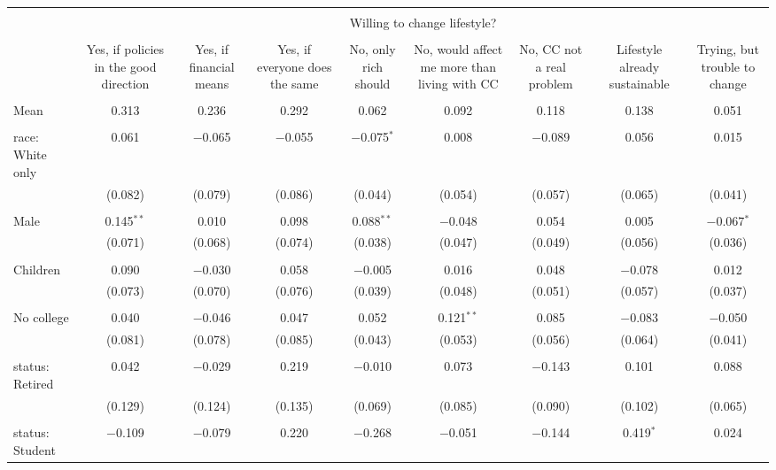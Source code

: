 
\begin{tabular}{@{\extracolsep{5pt}}lcccccccc} 
\\[-1.8ex]\hline 
\hline \\[-1.8ex] 
 & \multicolumn{8}{c}{Willing to change lifestyle?} \\ 
\cline{2-9} 
\\[-1.8ex] & Yes, if policies in the good direction & Yes, if financial means & Yes, if everyone does the same & No, only rich should & No, would affect me more than living with CC & No, CC not a real problem & Lifestyle already sustainable & Trying, but trouble to change \\ 
\hline \\[-1.8ex] 
 Mean & 0.313 & 0.236 & 0.292 & 0.062 & 0.092 & 0.118 & 0.138 & 0.051  \\ \hline \\[-1.8ex] race: White only & 0.061 & $-$0.065 & $-$0.055 & $-$0.075$^{*}$ & 0.008 & $-$0.089 & 0.056 & 0.015 \\ 
  & (0.082) & (0.079) & (0.086) & (0.044) & (0.054) & (0.057) & (0.065) & (0.041) \\ 
  & & & & & & & & \\ 
 Male & 0.145$^{**}$ & 0.010 & 0.098 & 0.088$^{**}$ & $-$0.048 & 0.054 & 0.005 & $-$0.067$^{*}$ \\ 
  & (0.071) & (0.068) & (0.074) & (0.038) & (0.047) & (0.049) & (0.056) & (0.036) \\ 
  & & & & & & & & \\ 
 Children & 0.090 & $-$0.030 & 0.058 & $-$0.005 & 0.016 & 0.048 & $-$0.078 & 0.012 \\ 
  & (0.073) & (0.070) & (0.076) & (0.039) & (0.048) & (0.051) & (0.057) & (0.037) \\ 
  & & & & & & & & \\ 
 No college & 0.040 & $-$0.046 & 0.047 & 0.052 & 0.121$^{**}$ & 0.085 & $-$0.083 & $-$0.050 \\ 
  & (0.081) & (0.078) & (0.085) & (0.043) & (0.053) & (0.056) & (0.064) & (0.041) \\ 
  & & & & & & & & \\ 
 status: Retired & 0.042 & $-$0.029 & 0.219 & $-$0.010 & 0.073 & $-$0.143 & 0.101 & 0.088 \\ 
  & (0.129) & (0.124) & (0.135) & (0.069) & (0.085) & (0.090) & (0.102) & (0.065) \\ 
  & & & & & & & & \\ 
 status: Student & $-$0.109 & $-$0.079 & 0.220 & $-$0.268 & $-$0.051 & $-$0.144 & 0.419$^{*}$ & 0.024 \\ 

\end{tabular}

